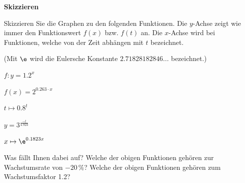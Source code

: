 \TNTeop{}


\newpage
\bbwActAufgabenNr{} \textbf{Skizzieren}

Skizzieren Sie die Graphen zu den folgenden Funktionen. Die $y$-Achse
zeigt wie immer den Funktionswert $f(x)$ bzw. $f(t)$ an. Die $x$-Achse
wird bei Funktionen, welche von der Zeit abhängen mit $t$ bezeichnet.

(Mit $\e$ wird die Eulersche Konstante $2.71828182846...$ bezeichnet.)

\begin{bbwAufgabenBlock}
\item $f: y=1.2^x$
\item $f(x) = 2^{0.263\cdot{}x}$
\item $t\mapsto{} 0.8^t$
\item $y=3^{\frac{-t}{4.923}}$
\item $x\mapsto \e^{0.1823x}$
\end{bbwAufgabenBlock}

Was fällt Ihnen dabei auf? Welche der obigen Funktionen gehören zur
Wachstumsrate von $-20\,\%$? Welche der obigen Funktionen gehören zum
Wachstumsfaktor 1.2?




\newpage
